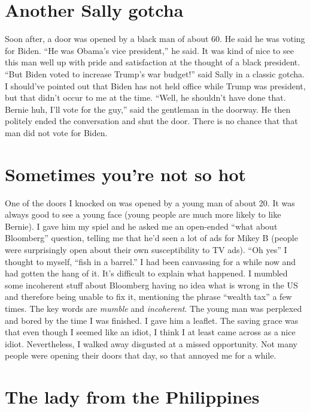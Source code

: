 \documentclass[]{book}
\begin{document}
\hypertarget{another-sally-gotcha}{%
\section{Another Sally gotcha}\label{another-sally-gotcha}}

Soon after, a door was opened by a black man of about 60. He said he was voting for Biden. ``He was Obama's vice president,'' he said. It was kind of nice to see this man well up with pride and satisfaction at the thought of a black president. ``But Biden voted to increase Trump's war budget!'' said Sally in a classic gotcha. I should've pointed out that Biden has not held office while Trump was president, but that didn't occur to me at the time. ``Well, he shouldn't have done that. Bernie huh, I'll vote for the guy,'' said the gentleman in the doorway. He then politely ended the conversation and shut the door. There is no chance that that man did not vote for Biden.

\hypertarget{sometimes-youre-not-so-hot}{%
\section{Sometimes you're not so hot}\label{sometimes-youre-not-so-hot}}

One of the doors I knocked on was opened by a young man of about 20. It was always good to see a young face (young people are much more likely to like Bernie). I gave him my spiel and he asked me an open-ended ``what about Bloomberg'' question, telling me that he'd seen a lot of ads for Mikey B (people were surprisingly open about their own susceptibility to TV ads). ``Oh yes'' I thought to myself, ``fish in a barrel.'' I had been canvassing for a while now and had gotten the hang of it. It's difficult to explain what happened. I mumbled some incoherent stuff about Bloomberg having no idea what is wrong in the US and therefore being unable to fix it, mentioning the phrase ``wealth tax'' a few times. The key words are \emph{mumble} and \emph{incoherent}. The young man was perplexed and bored by the time I was finished. I gave him a leaflet. The saving grace was that even though I seemed like an idiot, I think I at least came across as a nice idiot. Nevertheless, I walked away disgusted at a missed opportunity. Not many people were opening their doors that day, so that annoyed me for a while.

\hypertarget{the-lady-from-the-philippines}{%
\section{The lady from the Philippines}\label{the-lady-from-the-philippines}}
\end{document}
